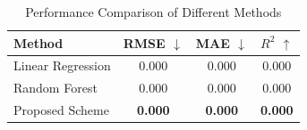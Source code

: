 \begin{table}[htbp]
    \centering
    \caption{Performance Comparison of Different Methods}
    \label{tab:comparison}
    \begin{tabular}{lccc}
        \toprule
        Method & RMSE $\downarrow$ & MAE $\downarrow$ & $R^{2}$ $\uparrow$ \\
        \midrule
        Linear Regression & 0.000 & 0.000 & 0.000 \\
        Random Forest~\cite{breiman2001rf} & 0.000 & 0.000 & 0.000 \\
        Proposed Scheme & \textbf{0.000} & \textbf{0.000} & \textbf{0.000} \\
        \bottomrule
    \end{tabular}
\end{table}
